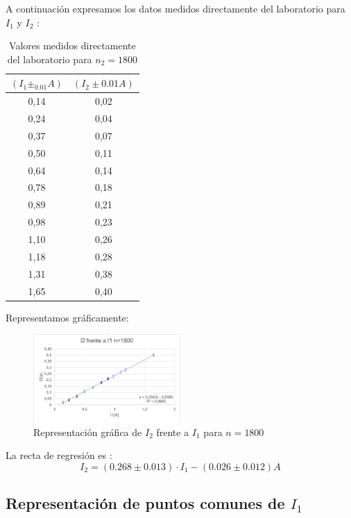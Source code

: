 \documentclass[11pt,letterpaper,twocolumn]{article}
\begin{document}
\begin{itemize}
				A continuación expresamos los datos medidos directamente del laboratorio para $I_1$ y $I_2$ :
				\begin{table}[H]
					\centering
					\caption{Valores medidos directamente del laboratorio para $n_2=1800$}
					\begin{tabular}{|c|c|}
						\hline
						$\left( I_1\pm_0.01 A \right) $ & $\left( I_2 \pm 0.01 A \right) $ \\ \hline
						0,14 & 0,02 \\ 
						0,24 & 0,04 \\
						0,37 & 0,07 \\
						0,50 & 0,11 \\ 
						0,64 & 0,14 \\
						0,78 & 0,18 \\
						0,89 & 0,21 \\
						0,98 & 0,23 \\
						1,10 & 0,26 \\
						1,18 & 0,28 \\
						1,31 & 0,38 \\
						1,65 & 0,40 \\ \hline
					\end{tabular}
					\label{}
				\end{table}
				
				Representamos gráficamente:
				\begin{figure}[H]
					\centering
					\includegraphics[width=0.5\textwidth]{In=1800.png}
					\caption{Representación gráfica de $I_2$ frente a $I_1 $ para $n=1800$}
					\label{fig:In-1800-png}
				\end{figure}
				La recta de regresión es :
				\begin{equation}
					\boxed{I_2={\left( 0.268 \pm 0.013 \right) \cdot I_1 -\left( 0.026 \pm 0.012 \right) A}}
				\end{equation}
			\end{itemize}		
			\subsection{Representación de puntos comunes de $I_1$}%
			\label{sec}
			
\end{document}
